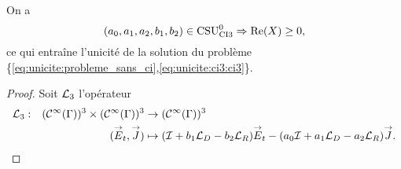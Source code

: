  \begin{prop}
    \label{prop:csu:ci3-0}
    On a 
    \begin{equation*}
      (a_0,a_1,a_2,b_1,b_2) \in \CSU[0]{CI3} \Rightarrow \Re(X)\ge 0,
    \end{equation*}
    ce qui entraîne l'unicité de la solution du problème \{\eqref{eq:unicite:probleme_sans_ci},\eqref{eq:unicite:ci3:ci3}\}.
  \end{prop}
  \begin{proof}
    Soit \(\LL_3\) l'opérateur
    \begin{equation}
      \label{eq:unicite:ci3:L3}
      \fonction{\LL_3}{(\mathcal{C}^\infty(\Gamma))^3 \times (\mathcal{C}^\infty(\Gamma))^3}{(\mathcal{C}^\infty(\Gamma))^3}
      {(\vE_t,\vJ)}{( \oI + b_1 \LD - b_2 \LR) \vE_t - (a_0\oI + a_1 \LD - a_2 \LR ) \vJ.}
    \end{equation}


\end{proof}
